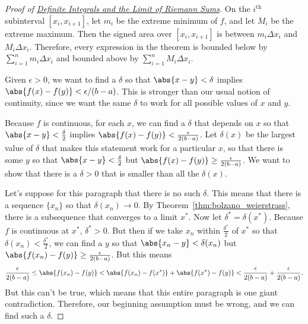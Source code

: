 \begin{proof}[Proof of {\hyperref[thm:riemann_sum]{Definite Integrals and the Limit of Riemann Sums}}]\label{pf:riemann_sum}
On the $i^\text{th}$ subinterval $[x_i,x_{i+1}]$, let $m_i$ be the extreme minimum of $f$, and let $M_i$ be the extreme maximum.  Then the signed area over $[x_i,x_{i+1}]$ is between $m_i\Delta x_i$ and $M_i\Delta x_i$.  Therefore, every expression in the theorem is bounded below by $\sum_{i=1}^n m_i\Delta x_i$ and bounded above by $\sum_{i=1}^n M_i\Delta x_i$.

Given $\epsilon>0$, we want to find a $\delta$ so that $\abs{x-y}<\delta$ implies $\abs{f(x)-f(y)}<\epsilon/(b-a)$.  This is stronger than our usual notion of continuity, since we want the same $\delta$ to work for all possible values of $x$ and $y$.

Because $f$ is continuous, for each $x$, we can find a $\delta$ that depends on $x$ so that $\abs{x-y}<\frac\delta2$ implies $\abs{f(x)-f(y)}<\frac\epsilon{2(b-a)}$.  Let $\delta(x)$ be the largest value of $\delta$ that makes this statement work for a particular $x$, so that there is some $y$ so that $\abs{x-y}<\frac\delta2$ but $\abs{f(x)-f(y)}\ge\frac\epsilon{2(b-a)}$.  We want to show that there is a $\delta>0$ that is smaller than all the $\delta(x)$.

Let's suppose for this paragraph that there is no such $\delta$.  This means that there is a sequence $\{x_n\}$ so that $\delta(x_n)\to0$.  By Theorem~\ref{thm:bolzano_weierstrass}, there is a subsequence that converges to a limit $x^*$.  Now let $\delta^*=\delta(x^*)$.  Because $f$ is continuous at $x^*$, $\delta^*>0$.  But then if we take $x_n$ within $\frac{\delta^*}2$ of $x^*$ so that $\delta(x_n)<\frac{\delta^*}2$, we can find a $y$ so that $\abs{x_n-y}<\delta(x_n)$ but $\abs{f(x_n)-f(y)}\ge\frac\epsilon{2(b-a)}$.  But this means
\[
 \frac\epsilon{2(b-a)}\le\abs{f(x_n)-f(y)}<\abs{f(x_n)-f(x^*)}+\abs{f(x^*)-f(y)}
 <\frac\epsilon{2(b-a)}+\frac\epsilon{2(b-a)}.
\]
But this can't be true, which means that this entire paragraph is one giant contradiction.  Therefore, our beginning assumption must be wrong, and we can find such a $\delta$.


\end{proof}
